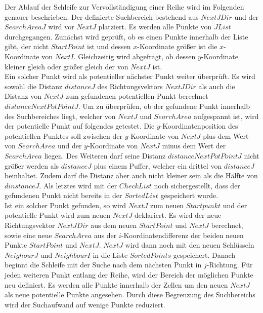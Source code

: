 Der Ablauf der Schleife zur Vervollständigung einer Reihe wird im Folgenden genauer beschrieben. Der definierte Suchbereich bestehend aus $NextJDir$ und der $SearchAreaJ$ wird vor $NextJ$ platziert. Es werden alle Punkte von $JList$ durchgegangen. Zunächst wird geprüft, ob es einen Punkte innerhalb der Liste gibt, der nicht $StartPoint$ ist und dessen $x$-Koordinate größer ist die $x$-Koordinate von $NextI$. Gleichzeitig wird abgefragt, ob dessen $y$-Koordinate kleiner gleich oder größer gleich der von $NextJ$ ist.\\

Ein solcher Punkt wird als potentieller nächster Punkt weiter überprüft. Es wird sowohl die Distanz $distanceJ$ des Richtungsvektors $NextJDir$ als auch die Distanz von $NextJ$ zum gefundenen potentiellen Punkt berechnet $distanceNextPotPointJ$. Um zu überprüfen, ob der gefundene Punkt innerhalb des Suchbereiches liegt, welcher von $NextJ$ und $SearchArea$ aufgespannt ist, wird der potentielle Punkt auf folgendes getestet. Die $y$-Koordinatenposition des potentiellen Punktes soll zwischen der $y$-Koordinate von $NextJ$ plus dem Wert von $SearchArea$ und der $y$-Koordinate von $NextJ$ minus dem Wert der $SearchArea$ liegen. Des Weiteren darf seine Distanz $distanceNextPotPointJ$ nicht größer werden als $distanceJ$ plus einem Puffer, welcher ein drittel von $distanceJ$ beinhaltet. Zudem darf die Distanz aber auch nicht kleiner sein als die Hälfte von $dinstanceJ$. Als letztes wird mit der $CheckList$ noch sichergestellt, dass der gefundenen Punkt nicht bereits in der $SortedList$ gespeichert wurde.\\

Ist ein solcher Punkt gefunden, so wird $NextJ$ zum neuen $Startpunkt$ und der potentielle Punkt wird zum neuen $NextJ$ deklariert. Es wird der neue Richtungsvektor $NextJDir$ aus dem neuen $StartPoint$ und $NextJ$ berechnet, sowie eine neue $SearchArea$ aus der $i$-Koordinatendifferenz der beiden neuen Punkte $StartPoint$ und $NextJ$. $NextJ$ wird dann noch mit den neuen Schlüsseln $NeighourJ$ und $NeighbourI$ in die Liste $SortedPoints$ gespeichert. Danach beginnt die Schleife mit der Suche nach dem nächsten Punkt in $j$-Richtung. Für jeden weiteren Punkt entlang der Reihe, wird der Bereich der möglichen Punkte neu definiert. Es werden alle Punkte innerhalb der Zellen um den neuen $NextJ$ als neue potentielle Punkte angesehen. Durch diese Begrenzung des Suchbereichs wird der Suchaufwand auf wenige Punkte reduziert. \\

